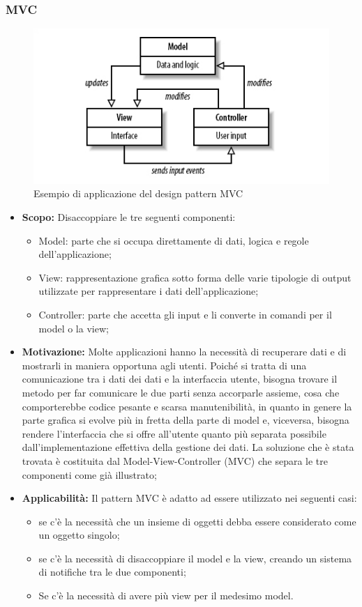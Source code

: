 \documentclass{scalatekids-article}
\begin{document}
\subsubsection{MVC}
\begin{figure}[H]
  \begin{center}
    \includegraphics[width=0.9 \textwidth, keepaspectratio]{img/designPattern/mvc.jpg}
    \caption{Esempio di applicazione del design pattern MVC}
  \end{center}
\end{figure}
\begin{itemize}
\item \textbf{Scopo:} Disaccoppiare le tre seguenti componenti:
  \begin{itemize}
  \item Model: parte che si occupa direttamente di dati, logica e regole dell'applicazione;
  \item View: rappresentazione grafica sotto forma delle varie tipologie di output utilizzate per rappresentare i dati dell'applicazione;
  \item Controller: parte che accetta gli input e li converte in comandi per il model o la view;
  \end{itemize}
\item \textbf{Motivazione:} Molte applicazioni hanno la necessità di recuperare dati e di mostrarli in maniera opportuna agli utenti. Poiché si tratta di una comunicazione tra i dati dei dati e la interfaccia utente, bisogna trovare il metodo per far comunicare le due parti senza accorparle assieme, cosa che comporterebbe codice pesante e scarsa manutenibilità, in quanto in genere la parte grafica si evolve più in fretta della parte di model e, viceversa, bisogna rendere l'interfaccia che si offre all'utente quanto più separata possibile dall'implementazione effettiva della gestione dei dati. La soluzione che è stata trovata è costituita dal  Model-View-Controller (MVC) che separa le tre componenti come già illustrato;
\item \textbf{Applicabilità:} Il pattern MVC è adatto ad essere utilizzato nei seguenti casi:
  \begin{itemize}
  \item se c'è la necessità che un insieme di oggetti debba essere considerato come un oggetto singolo;
  \item se c'è la necessità di disaccoppiare il model e la view, creando un sistema di notifiche tra le due componenti;
  \item Se c'è la necessità di avere più view per il medesimo model.
  \end{itemize}
\end{itemize}
\end{document}
